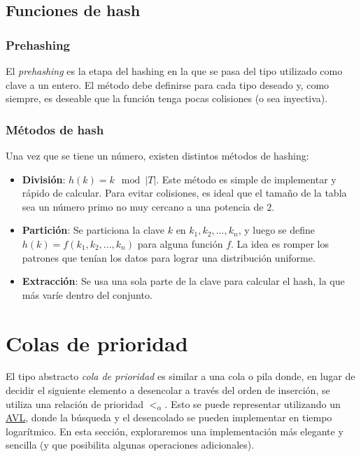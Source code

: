 \documentclass{article}
\begin{document}
\subsection{Funciones de hash}

\subsubsection{Prehashing}

El \textit{prehashing} es la etapa del hashing en la que se pasa del tipo utilizado como clave a un entero. El método debe definirse para cada tipo deseado y, como siempre, es deseable que la función tenga pocas colisiones (o sea inyectiva).

\subsubsection{Métodos de hash}

Una vez que se tiene un número, existen distintos métodos de hashing:
\begin{itemize}
    \item \textbf{División}: $h(k) = k\mod{|T|}$. Este método es simple de implementar y rápido de calcular. Para evitar colisiones, es ideal que el tamaño de la tabla sea un número primo no muy cercano a una potencia de $2$.
    \item \textbf{Partición}: Se particiona la clave $k$ en $k_1, k_2, ..., k_n$, y luego se define $h(k) = f(k_1, k_2, ..., k_n)$ para alguna función $f$. La idea es romper los patrones que tenían los datos para lograr una distribución uniforme.
    \item \textbf{Extracción}: Se usa una sola parte de la clave para calcular el hash, la que más varíe dentro del conjunto.
\end{itemize}

\section{Colas de prioridad}

El tipo abstracto \textit{cola de prioridad} es similar a una cola o pila donde, en lugar de decidir el siguiente elemento a desencolar a través del orden de inserción, se utiliza una relación de prioridad $<_{\alpha}$. Esto se puede representar utilizando un \hyperref[subsec-avl]{AVL}, donde la búsqueda y el desencolado se pueden implementar en tiempo logarítmico. En esta sección, exploraremos una implementación más elegante y sencilla (y que posibilita algunas operaciones adicionales).
\end{document}
